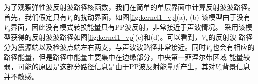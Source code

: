 为了观察弹性波反射波路径核函数，我们在简单的单层界面中计算反射波波路径。首先，我们假定只有$V_p$的扰动界面，如图\ref{fig:kernel1_vp}(a), (b)
该模型由于没有$V_s$界面，因此没有模式转换能量只有PP波反射，非常接近于声波情况。
采用该模型获得的反射波波路径如图\ref{fig:kernel1_vp}(c)和(d)。可以看到，$V_p$的反射波
路径分为震源端以及检波点端左右两支，与声波波路径非常接近。同时$V_s$也会有相应的路径能量，但是路径中能量主要集中在边缘部分，中央第一菲涅尔带区域
能量较弱，可能的原因是这部分路径信息是由于PP波反射能量所产生，其对$V_s$背景信息并不敏感。

